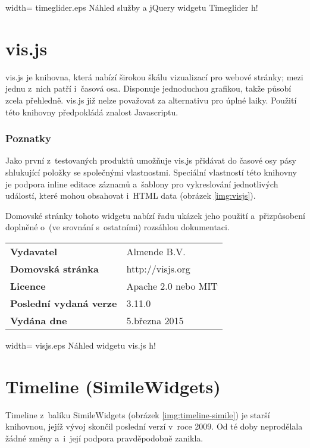 		  {width=\textwidth}
		  {timeglider.eps}
		  {Náhled služby a jQuery widgetu {\sf Timeglider}}
		  {h!}
		
	\section{\sf vis.js}
	\label{analyza-visjs}
		{\sf vis.js} je knihovna, která nabízí širokou škálu vizualizací pro webové stránky; mezi jednu z~nich patří i~časová osa. Disponuje jednoduchou grafikou, takže působí zcela přehledně. {\sf vis.js} již nelze považovat za alternativu pro úplné laiky. Použití této knihovny předpokládá znalost Javascriptu. 
		
		\subsubsection*{Poznatky} 
		Jako první z~testovaných produktů umožňuje {\sf vis.js} přidávat do časové osy pásy shlukující položky se společnými vlastnostmi. Speciální vlastností této knihovny je podpora inline editace záznamů a~šablony pro vykreslování jednotlivých událostí, které mohou obsahovat i~HTML data (obrázek \ref{img:visjs}).
		
		Domovské stránky tohoto widgetu nabízí řadu ukázek jeho použití a~přizpů\-sobení doplněné o~(ve srovnání s~ostatními) rozsáhlou dokumentaci.
	
		\vspace{\baselineskip}
		\renewcommand{\arraystretch}{1.3}
		\noindent
		\begin{tabularx}{\textwidth}{|lX|}
		\hline
		\bf Vydavatel &  Almende B.\ts V. \\
		\bf Domovská stránka & http://visjs.org \\
		\bf Licence & Apache 2.0 nebo MIT \\
		\bf Poslední vydaná verze & 3.11.0 \\
		\bf Vydána dne & 5.\ts března 2015 \\
		\hline
		\end{tabularx}
		
		  {width=\textwidth}
		  {visjs.eps}
		  {Náhled widgetu {\sf vis.js}}
		  {h!}
		
	\section{\sf Timeline ({\sf SimileWidgets})}
	\label{analyza-timeline-simile}
		{\sf Timeline} z~balíku {\sf SimileWidgets} (obrázek \ref{img:timeline-simile}) je starší knihovnou, jejíž vývoj skončil poslední verzí v~roce 2009. Od té doby neprodělala žádné změny a~i~její podpora pravdě\-podobně zanikla.
		
